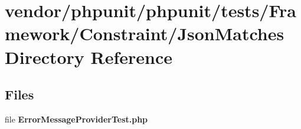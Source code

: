 \section{vendor/phpunit/phpunit/tests/\+Framework/\+Constraint/\+Json\+Matches Directory Reference}
\label{dir_2e47ac3e12f4ee49c5b29db60c3b5270}
\subsection*{Files}
\begin{DoxyCompactItemize}
\item 
file {\bf Error\+Message\+Provider\+Test.\+php}
\end{DoxyCompactItemize}
